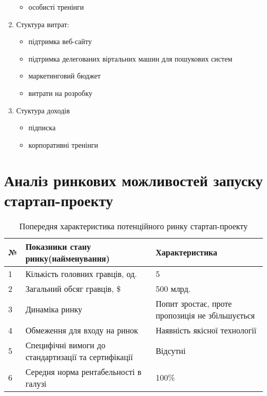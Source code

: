 \begin{enumerate}
\begin{itemize}
		\item особисті тренінги
	\end{itemize}
	\item Стуктура витрат:
	\begin{itemize}
		\item підтримка веб-сайту
		\item підтримка делегованих віртальних машин для пошукових систем
		\item маркетинговий бюджет
		\item витрати на розробку
	\end{itemize}
	\item Стуктура доходів
	\begin{itemize}
		\item підписка 
		\item корпоративні тренінги
	\end{itemize}
\end{enumerate}
\section{Аналіз ринкових можливостей запуску стартап-проекту}
\begin{table}
	\begin{center}
		\begin{tabular}
			{|l|p{8cm}|p{5cm}|}\hline
			\bf{№} & \bf{Показники стану ринку(найменування)} & \bf{Характеристика} \\ \hline
			1 & Кількість головних гравців, од. & 5 \\ \hline
			2 & Загальний обсяг гравців, \$ & 500 млрд. \\ \hline
			3 & Динаміка ринку & Попит зростає, проте пропозиція не збільшується\\ \hline
			4 & Обмеження для входу на ринок& Наявність якісної технології\\ \hline
			5 & Специфічні вимоги до стандартизації та сертифікації& Відсутні \\ \hline
			6 & Середня норма рентабельності в галузі & 100\% \\ \hline
		\end{tabular}
	\end{center}
	\caption{Попередня характеристика потенційного ринку стартап-проекту}
\end{table}


